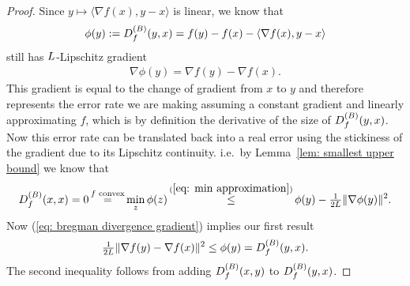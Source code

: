 \begin{proof}
	Since \(y\mapsto \langle\nabla f(x), y-x\rangle\) is linear, we know that
	\begin{align*}
		\phi(y):=D^{(B)}_{f}(y,x) = f(y)-f(x)-\langle \nabla f(x), y-x\rangle 
	\end{align*}
	still has \(L\)-Lipschitz gradient
	\begin{align}\label{eq: bregman divergence gradient}
		\nabla\phi(y) = \nabla f(y) - \nabla f(x).
	\end{align}
	This gradient is equal to the change of gradient from \(x\) to \(y\) and 
	therefore represents the error rate we are making assuming a constant gradient
	and linearly approximating \(f\), which is by definition the derivative of the size of
	\(D^{(B)}_{f}(y,x)\). Now this error rate can be translated
 	back into a real error using the stickiness of the gradient due to
	its Lipschitz continuity. i.e.\ by Lemma~\ref{lem: smallest upper bound} we know that
	\begin{align*}
		\bregmanDiv{f}(x,x) = 0
		\xeq{f\text{ convex}} \min_z\phi(z)
		\xle{(\ref{eq: min approximation})} \phi(y) - \tfrac{1}{2\ubound}\|\nabla \phi(y)\|^2.
	\end{align*}
	Now (\ref{eq: bregman divergence gradient}) implies our first result
	\begin{align*}
		\tfrac{1}{2L}\|\nabla f(y) - \nabla f(x)\|^2
		\le \phi(y) =D^{(B)}_{f}(y,x).
	\end{align*}
	The second inequality follows from adding \(D^{(B)}_{f}(x,y)\) to
	\(D^{(B)}_{f}(y,x)\).
\end{proof}

